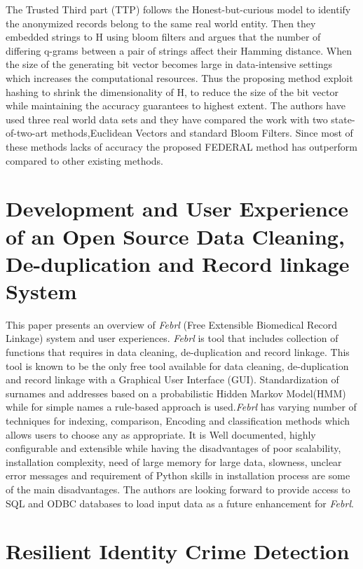 \documentclass[a4paper]{article}
\begin{document}
The Trusted Third part (TTP) follows the Honest-but-curious model to identify the anonymized records belong to the same real world entity. Then they embedded strings to H using bloom filters and argues that the number of differing q-grams between a pair of strings affect their Hamming distance. When the size of the generating bit vector becomes large in data-intensive settings which increases the computational resources. Thus the proposing method exploit hashing to shrink the dimensionality of H, to reduce the size of the bit vector while maintaining the accuracy guarantees to highest extent. The authors have used three real world data sets and they have compared the work with two state-of-two-art methods,Euclidean Vectors and standard Bloom Filters. Since most of these methods lacks of accuracy the proposed FEDERAL method has outperform compared to other existing methods.


\section*{Development and User Experience of an Open Source Data Cleaning, De-duplication and Record linkage System}

This paper \cite{Christen2009} presents an overview of \textit{Febrl} (Free Extensible Biomedical Record Linkage) system and user experiences. \textit{Febrl} is tool that includes collection of functions that requires in data cleaning, de-duplication and record linkage. This tool is known to be the only free tool available for data cleaning, de-duplication and record linkage with a Graphical User Interface (GUI). Standardization of surnames and addresses based on a probabilistic Hidden Markov Model(HMM) while for simple names a rule-based approach is used.\textit{Febrl} has varying number of techniques for indexing, comparison, Encoding and classification methods which allows users to choose any as appropriate. It is Well documented, highly configurable and extensible while having the disadvantages of poor scalability, installation complexity, need of large memory for large data, slowness, unclear error messages and requirement of Python skills in installation process are some of the main disadvantages. The authors are looking forward to provide access to SQL and ODBC databases to load input data as a future enhancement for \textit{Febrl}. 
    

\section*{Resilient Identity Crime Detection}
\end{document}
